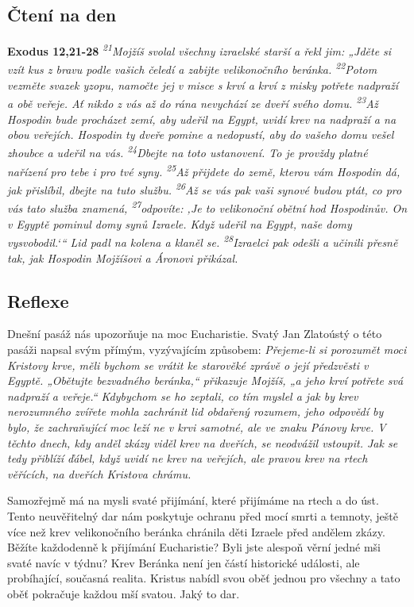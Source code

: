 \documentclass[11pt]{article}
\begin{document}
\subsection*{Čtení na den}
\textbf{Exodus 12,21-28}
\newline
\textit{
\textsuperscript{21}Mojžíš svolal všechny izraelské starší a řekl jim: „Jděte si vzít kus z bravu podle vašich čeledí a zabijte velikonočního beránka.
\textsuperscript{22}Potom vezměte svazek yzopu, namočte jej v misce s krví a krví z misky potřete nadpraží a obě veřeje. Ať nikdo z vás až do rána nevychází ze dveří svého domu.
\textsuperscript{23}Až Hospodin bude procházet zemí, aby udeřil na Egypt, uvidí krev na nadpraží a na obou veřejích. Hospodin ty dveře pomine a nedopustí, aby do vašeho domu vešel zhoubce a udeřil na vás. 
\textsuperscript{24}Dbejte na toto ustanovení. To je provždy platné nařízení pro tebe i pro tvé syny.
\textsuperscript{25}Až přijdete do země, kterou vám Hospodin dá, jak přislíbil, dbejte na tuto službu.
\textsuperscript{26}Až se vás pak vaši synové budou ptát, co pro vás tato služba znamená,
\textsuperscript{27}odpovíte: ‚Je to velikonoční obětní hod Hospodinův. On v Egyptě pominul domy synů Izraele. Když udeřil na Egypt, naše domy vysvobodil.‘“ Lid padl na kolena a klaněl se.
\textsuperscript{28}Izraelci pak odešli a učinili přesně tak, jak Hospodin Mojžíšovi a Áronovi přikázal.
}

\subsection*{Reflexe}

Dnešní pasáž nás upozorňuje na moc Eucharistie. Svatý Jan Zlatoústý o této pasáži napsal svým přímým,
vyzývajícím způsobem:
\textit{Přejeme-li si porozumět moci Kristovy krve, měli bychom se vrátit ke starověké zprávě o její
předzvěsti v Egyptě. „Obětujte bezvadného beránka,“ přikazuje Mojžíš, „a jeho krví potřete
svá nadpraží a veřeje.“ Kdybychom se ho zeptali, co tím myslel a jak by krev nerozumného
zvířete mohla zachránit lid obdařený rozumem, jeho odpovědí by bylo, že zachraňující moc
leží ne v krvi samotné, ale ve znaku Pánovy krve. V těchto dnech, kdy anděl zkázy viděl krev
na dveřích, se neodvážil vstoupit. Jak se tedy přiblíží ďábel, když uvidí ne krev na veřejích, ale
pravou krev na rtech věřících, na dveřích Kristova chrámu.}

Samozřejmě má na mysli svaté přijímání, které přijímáme na rtech a do úst. Tento neuvěřitelný dar nám
poskytuje ochranu před mocí smrti a temnoty, ještě více než krev velikonočního beránka chránila děti
Izraele před andělem zkázy. Běžíte každodenně k přijímání Eucharistie? Byli jste alespoň věrní jedné mši
svaté navíc v týdnu? Krev Beránka není jen částí historické události, ale probíhající, současná realita.
Kristus nabídl svou oběť jednou pro všechny a tato oběť pokračuje každou mší svatou. Jaký to dar.
\end{document}

